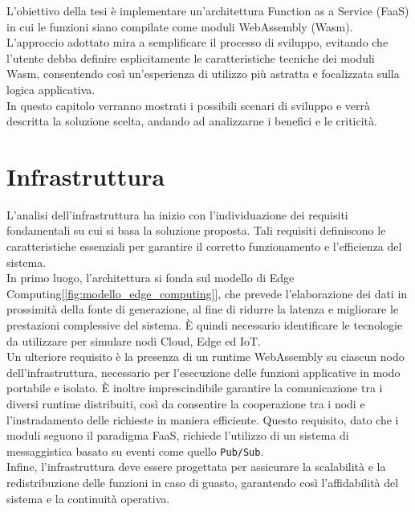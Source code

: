 
L'obiettivo della tesi è implementare un'architettura Function as a Service (FaaS) in cui le funzioni siano compilate come moduli WebAssembly (Wasm). L'approccio adottato mira a semplificare il processo di sviluppo, evitando che l'utente debba definire esplicitamente le caratteristiche tecniche dei moduli Wasm, consentendo così un'esperienza di utilizzo più astratta e focalizzata sulla logica applicativa.\\
In questo capitolo verranno mostrati i possibili scenari di sviluppo e verrà descritta la soluzione scelta, andando ad analizzarne i benefici e le criticità. 

\section{Infrastruttura}

L'analisi dell'infrastruttura ha inizio con l'individuazione dei requisiti fondamentali su cui si basa la soluzione proposta. Tali requisiti definiscono le caratteristiche essenziali per garantire il corretto funzionamento e l'efficienza del sistema.\\
In primo luogo, l'architettura si fonda sul modello di Edge Computing[\ref{fig:modello_edge_computing}], che prevede l'elaborazione dei dati in prossimità della fonte di generazione, al fine di ridurre la latenza e migliorare le prestazioni complessive del sistema. È quindi necessario identificare le tecnologie da utilizzare per simulare nodi Cloud, Edge ed IoT.\\
Un ulteriore requisito è la presenza di un runtime WebAssembly su ciascun nodo dell'infrastruttura, necessario per l'esecuzione delle funzioni applicative in modo portabile e isolato. È inoltre imprescindibile garantire la comunicazione tra i diversi runtime distribuiti, così da consentire la cooperazione tra i nodi e l'instradamento delle richieste in maniera efficiente.
Questo requisito, dato che i moduli seguono il paradigma FaaS, richiede l'utilizzo di un sistema di messaggistica basato su eventi come quello \texttt{Pub/Sub}. \\
Infine, l'infrastruttura deve essere progettata per assicurare la scalabilità e la redistribuzione delle funzioni in caso di guasto, garantendo così l'affidabilità del sistema e la continuità operativa.

